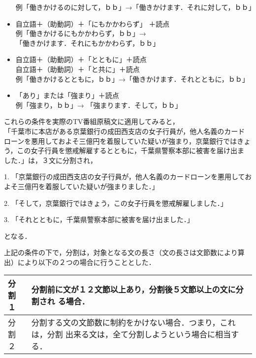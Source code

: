 \begin{list}{}{}
\begin{itemize}
      例「働きかけるのに対して，ｂｂ」→「働きかけます．それに対して，ｂｂ」
\item 自立語＋（助動詞）＋「にもかかわらず」 ＋読点\\
      例「働きかけるにもかかわらず，ｂｂ」→\\
     \hspace*{1cm}「働きかけます．それにもかかわらず，ｂｂ」
\item 自立語＋（助動詞）＋「とともに」＋読点\\
      自立語＋（助動詞）＋「と共に」＋読点\\
      例「働きかけるとともに，ｂｂ」→「働きかけます．それとともに，ｂｂ」
\item 「あり」または「強まり」＋読点\\
      例「強まり，ｂｂ」→ 「強まります．そして，ｂｂ」
\end{itemize}
\end{list}

これらの条件を実際のTV番組原稿文に適用してみると，\\
「千葉市に本店がある京葉銀行の成田西支店の女子行員が，他人名義のカード
ローンを悪用しておよそ三億円を着服していた疑いが強まり，京葉銀行ではきょ
う，この女子行員を懲戒解雇するとともに，千葉県警察本部に被害を届け出ま
した．」は，３文に分割され，
\begin{list}{}{}
\item[1.] 「京葉銀行の成田西支店の女子行員が，他人名義のカードローンを悪用しておよそ三億円を着服していた疑いが強まりました．」
\item[2.] 「そして，京葉銀行ではきょう，この女子行員を懲戒解雇しました．」
\item[3.] 「それとともに，千葉県警察本部に被害を届け出ました．」
\end{list}
となる．

上記の条件の下で，分割は，対象となる文の長さ（文の長さは文節数により算
出）により以下の２つの場合に行うこととした．

\vspace{-3mm}
\begin{table}[h]
\begin{center}
\begin{tabular}{|l|p{10cm}|} \hline
分割１ & 分割前に文が１２文節以上あり，分割後５文節以上の文に分割され
る場合．\\ \hline
分割２ & 分割する文の文節数に制約をかけない場合．つまり，これは，分割
出来る文は，全て分割しようという場合に相当する．\\ \hline
\end{tabular}
\end{center}
\end{table}

